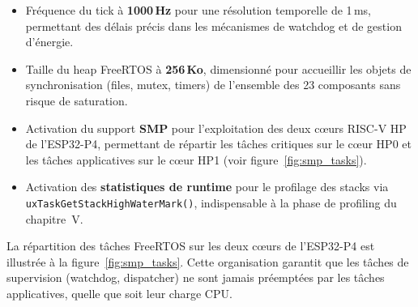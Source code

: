 \begin{itemize}
  \item Fréquence du tick à \textbf{1000\,Hz} pour une résolution
    temporelle de 1\,ms, permettant des délais précis dans les
    mécanismes de watchdog et de gestion d'énergie.
  \item Taille du heap FreeRTOS à \textbf{256\,Ko}, dimensionné pour
    accueillir les objets de synchronisation (files, mutex, timers)
    de l'ensemble des 23 composants sans risque de saturation.
  \item Activation du support \textbf{SMP} pour l'exploitation des
    deux c\oe{}urs RISC-V HP de l'ESP32-P4, permettant de répartir
    les tâches critiques sur le c\oe{}ur HP0 et les tâches
    applicatives sur le c\oe{}ur HP1 (voir figure~\ref{fig:smp_tasks}).
  \item Activation des \textbf{statistiques de runtime} pour le
    profilage des stacks via \texttt{uxTaskGetStackHighWaterMark()},
    indispensable à la phase de profiling du chapitre~V.
\end{itemize}
\newpage
La répartition des tâches FreeRTOS sur les deux c\oe{}urs de
l'ESP32-P4 est illustrée à la figure~\ref{fig:smp_tasks}. Cette
organisation garantit que les tâches de supervision (watchdog,
dispatcher) ne sont jamais préemptées par les tâches applicatives,
quelle que soit leur charge CPU.

